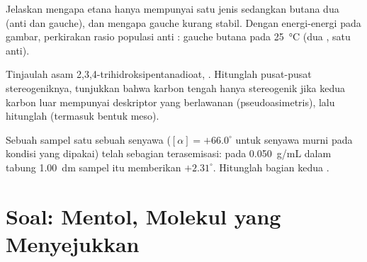 \begin{exercise}[$\star\star\star$]\label{exo:b1:stereochemistry-in-depth:10}
Jelaskan mengapa etana hanya mempunyai satu jenis 
sedangkan butana dua (anti dan gauche), dan mengapa gauche kurang stabil.
Dengan energi-energi pada gambar, perkirakan rasio populasi anti : gauche
butana pada \qty{25}{\celsius} (dua , satu anti).
\end{exercise}

\begin{exercise}[$\star\star\star$]\label{exo:b1:stereochemistry-in-depth:11}
Tinjaulah asam 2,3,4-trihidroksipentanadioat,
. Hitunglah pusat-pusat
stereogeniknya, tunjukkan bahwa karbon tengah hanya stereogenik jika
kedua karbon luar mempunyai deskriptor yang berlawanan
(pseudoasimetris), lalu hitunglah  (termasuk bentuk
meso).
\end{exercise}

\begin{exercise}[$\star\star\star$]\label{exo:b1:stereochemistry-in-depth:12}
Sebuah sampel satu  sebuah senyawa ($[\alpha] = +66.0^\circ$
untuk senyawa murni pada kondisi yang dipakai) telah sebagian
terasemisasi: pada \qty{0.050}{g/mL} dalam tabung \qty{1.00}{dm} sampel
itu memberikan $+2.31^\circ$. Hitunglah bagian kedua .
\end{exercise}

\section{Soal: Mentol, Molekul yang Menyejukkan}

